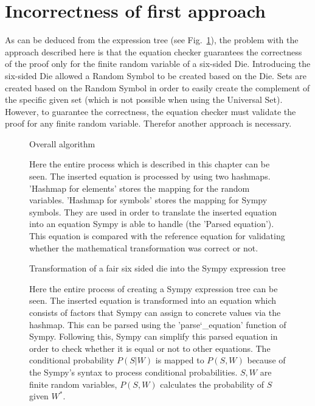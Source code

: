         \section{Incorrectness of first approach}
        As can be deduced from the expression tree (see Fig.~\ref{fig:Sympy expression tree with specific values}), the problem with the approach described here is that the equation checker guarantees the correctness of the proof only for the finite random
        variable of a six-sided Die.
        Introducing the six-sided Die allowed a Random Symbol to be created based on the Die.
        Sets are created based on the Random Symbol in order to easily create the complement of the specific given set (which is not possible when using the
        Universal Set). However, to guarantee the correctness, the equation checker must validate the proof for any finite random variable.
        Therefor another approach is necessary.
        \begin{figure}[h]
            
            \caption{Overall algorithm}
            \caption*{Here the entire process which is described in this chapter can be seen. The inserted equation is processed by using two hashmaps. 'Hashmap for elements' stores the mapping for the random variables.
            'Hashmap for symbols' stores the mapping for Sympy symbols. They are used in order to translate the inserted equation into an equation Sympy is able to handle (the 'Parsed equation'). This equation is compared
            with the reference equation for validating whether the mathematical transformation was correct or not.}
        \end{figure}
        \begin{figure}[h]
            \centering
            
            \caption{Transformation of a fair six sided die into the Sympy expression tree}
            \caption*{Here the entire process of creating a Sympy expression tree can be seen. The inserted equation is transformed into an equation which consists of factors that Sympy can assign to concrete values via the hashmap. This
            can be parsed using the 'parse\char`_equation' function of Sympy. Following this, Sympy can simplify this parsed equation in order to check whether it is equal or not to other equations. The conditional probability $P(S|W)$ is mapped to $P(S,W)$ because
            of the Sympy's syntax to process conditional probabilities. $S,W$ are finite random variables, $P(S,W)$ calculates the probability of $S$ given $W^{\ast}$.}
            \label{fig:Sympy expression tree with specific values}
        \end{figure}

